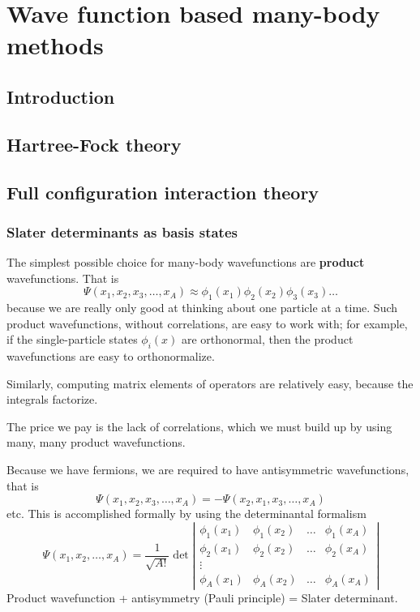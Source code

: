 \chapter{Wave function based many-body methods}
\author{Morten Hjorth-Jensen}




\section{Introduction}
\section{Hartree-Fock theory}
\section{Full configuration interaction theory}
\subsection{Slater determinants as basis states}

The simplest possible choice for many-body wavefunctions are \textbf{product} wavefunctions.
That is
\[ 
\Psi(x_1, x_2, x_3, \ldots, x_A) \approx \phi_1(x_1) \phi_2(x_2) \phi_3(x_3) \ldots
\]
because we are really only good  at thinking about one particle at a time. Such 
product wavefunctions, without correlations, are easy to 
work with; for example, if the single-particle states $\phi_i(x)$ are orthonormal, then 
the product wavefunctions are easy to orthonormalize.   

Similarly, computing matrix elements of operators are relatively easy, because the 
integrals factorize.


The price we pay is the lack of correlations, which we must build up by using many, many product 
wavefunctions.


Because we have fermions, we are required to have antisymmetric wavefunctions, that is
\[
\Psi(x_1, x_2, x_3, \ldots, x_A) = - \Psi(x_2, x_1, x_3, \ldots, x_A)
\]
etc. This is accomplished formally by using the determinantal formalism
\[
\Psi(x_1, x_2, \ldots, x_A) 
= \frac{1}{\sqrt{A!}} 
\det \left | 
\begin{array}{cccc}
\phi_1(x_1) & \phi_1(x_2) & \ldots & \phi_1(x_A) \\
\phi_2(x_1) & \phi_2(x_2) & \ldots & \phi_2(x_A) \\
 \vdots & & &  \\
\phi_A(x_1) & \phi_A(x_2) & \ldots & \phi_A(x_A) 
\end{array}
\right |
\]
Product wavefunction + antisymmetry (Pauli principle) = Slater determinant. 


